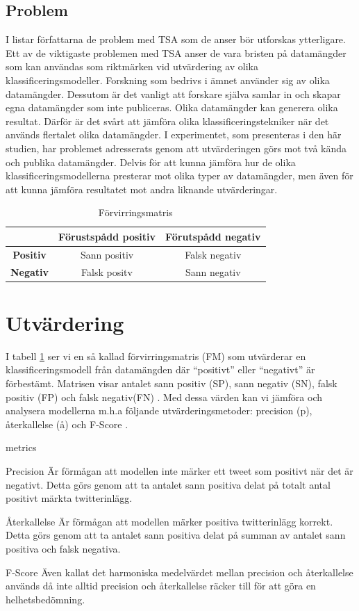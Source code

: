 \documentclass{kaumasters} %
\begin{document}
\subsection{Problem} \label{TSAprob}
I \cite{TSAsurvey} listar författarna de problem med TSA som de anser bör utforskas ytterligare. Ett av de viktigaste problemen med TSA anser de vara bristen på datamängder som kan användas som riktmärken vid utvärdering av olika klassificeringsmodeller. Forskning som bedrivs i ämnet använder sig av olika datamängder. Dessutom är det vanligt att forskare själva samlar in och skapar egna datamängder som inte publiceras. Olika datamängder kan generera olika resultat. Därför är det svårt att jämföra olika klassificeringstekniker när det används flertalet olika datamängder. I experimentet, som presenteras i den här studien, har problemet adresserats genom att utvärderingen görs mot två kända och publika datamängder. Delvis för att kunna jämföra hur de olika klassificeringsmodellerna presterar mot olika typer av datamängder, men även för att kunna jämföra resultatet mot andra liknande utvärderingar.
\begin{table}
\centering
\caption{Förvirringsmatris}
\label{tab:fm}
	\begin{tabular}{ccc}
	\toprule
	 & \textbf{Förustspådd positiv} & \textbf{Förutspådd negativ} \\
	\midrule
	\textbf{Positiv} & Sann positiv & Falsk negativ \\
	\textbf{Negativ} & Falsk positv & Sann negativ \\
	\bottomrule
\end{tabular}
\end{table}

\section{Utvärdering} \label{TSAev}
I tabell \ref{tab:fm} ser vi en så kallad förvirringsmatris (FM) som utvärderar en klassificeringsmodell från datamängden där “positivt” eller “negativt” är förbestämt. Matrisen visar antalet sann positiv (SP), sann negativ (SN), falsk positiv (FP) och falsk negativ(FN) \cite{wiki:003}. Med dessa värden kan vi jämföra och analysera modellerna m.h.a följande utvärderingsmetoder: precision (p), återkallelse (å) \cite{wiki:002} och F-Score \cite{wiki:001}.

\begin{labeling}{metrics}
\item [Precision] Är förmågan att modellen inte märker ett tweet som positivt när det är negativt. Detta görs genom att ta antalet sann positiva delat på totalt antal positivt märkta twitterinlägg. 
\item [Återkallelse] Är förmågan att modellen märker positiva twitterinlägg korrekt. Detta görs genom att ta antalet sann positiva delat på summan av antalet sann positiva och falsk negativa.
\item [F-Score] Även kallat det harmoniska medelvärdet mellan precision och återkallelse används då inte alltid precision och återkallelse räcker till för att göra en helhetsbedömning. 
\end{labeling}
\end{document}
